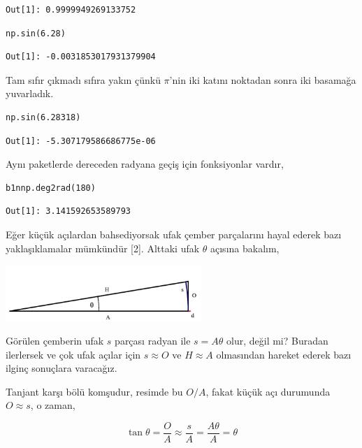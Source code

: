 \documentclass[12pt,fleqn]{article}\usepackage{../../common}
\begin{document}
\begin{verbatim}
Out[1]: 0.9999949269133752
\end{verbatim}

\begin{verbatim}
np.sin(6.28)
\end{verbatim}

\begin{verbatim}
Out[1]: -0.0031853017931379904
\end{verbatim}

Tam sıfır çıkmadı sıfıra yakın çünkü $\pi$'nin iki katını noktadan sonra iki
basamağa yuvarladık.

\begin{verbatim}
np.sin(6.28318)
\end{verbatim}

\begin{verbatim}
Out[1]: -5.307179586686775e-06
\end{verbatim}

Aynı paketlerde dereceden radyana geçiş için fonksiyonlar vardır,

\begin{verbatim}
b1nnp.deg2rad(180)
\end{verbatim}

\begin{verbatim}
Out[1]: 3.141592653589793
\end{verbatim}

Eğer küçük açılardan bahsediyorsak ufak çember parçalarını hayal ederek bazı
yaklaşıklamalar mümkündür [2]. Alttaki ufak $\theta$ açısına bakalım,

\includegraphics[width=20em]{ode_mattuck_50_trig_06.jpg}

Görülen çemberin ufak $s$ parçası radyan ile $s = A \theta$ olur, değil mi?
Buradan ilerlersek ve çok ufak açılar için $s \approx O$ ve $H \approx A$
olmasından hareket ederek bazı ilginç sonuçlara varacağız.

Tanjant karşı bölü komşudur, resimde bu $O / A$, fakat küçük açı durumunda
$O \approx s$, o zaman, 

$$
\tan \theta = \frac{O}{A} \approx \frac{s}{A} = \frac{A\theta}{A} = \theta
$$
\end{document}
